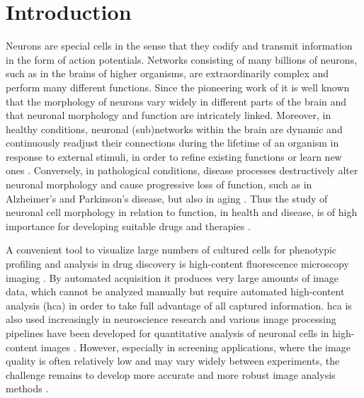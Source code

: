 \section{Introduction}
\label{sec:intro}

Neurons are special cells in the sense that they codify and transmit information in the form of action potentials. Networks consisting of many billions of neurons, such as in the brains of higher organisms, are extraordinarily complex and perform many different functions. Since the pioneering work of \cite{ramon2008histologia} it is well known that the morphology of neurons vary widely in different parts of the brain and that neuronal morphology and function are intricately linked. Moreover, in healthy conditions, neuronal (sub)networks within the brain are dynamic and continuously readjust their connections during the lifetime of an organism in response to external stimuli, in order to refine existing functions or learn new ones \cite{ascolitrees}. Conversely, in pathological conditions, disease processes destructively alter neuronal morphology and cause progressive loss of function, such as in Alzheimer's and Parkinson's disease, but also in aging \cite{van2001need}. Thus the study of neuronal cell morphology in relation to function, in health and disease, is of high importance for developing suitable drugs and therapies \cite{meijering2010neuron}.

A convenient tool to visualize large numbers of cultured cells for phenotypic profiling and analysis in drug discovery is high-content fluorescence microscopy imaging \cite{xia2012concise, antony2013light, singh2014increasing, bougen2017large}. By automated acquisition it produces very large amounts of image data, which cannot be analyzed manually but require automated high-content analysis (\gls{hca}) in order to take full advantage of all captured information. \gls{hca} is also used increasingly in neuroscience research \cite{dragunow2008high, anderl2009neuronal, jain2012high} and various image processing pipelines have been developed for quantitative analysis of neuronal cells in high-content images \cite{vallotton2007automated, zhang2007novel, wu2010automatic, dehmelt2011neuritequant, radio2012neurite, charoenkwan2013hcs, smafield2015automatic}. However, especially in screening applications, where the image quality is often relatively low and may vary widely between experiments, the challenge remains to develop more accurate and more robust image analysis methods \cite{sommer2013machine, kraus2016computer, meijering2016imagining}.

